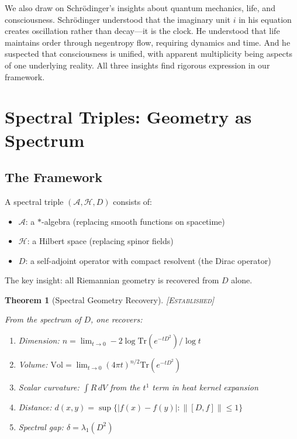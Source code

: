 \documentclass[11pt,a4paper]{article}
\newtheorem{theorem}{Theorem}[section]
\theoremstyle{definition}
\theoremstyle{remark}
\begin{document}
We also draw on Schr\"odinger's insights about quantum mechanics, life, and consciousness. Schr\"odinger understood that the imaginary unit $i$ in his equation creates oscillation rather than decay---it is the clock. He understood that life maintains order through negentropy flow, requiring dynamics and time. And he suspected that consciousness is unified, with apparent multiplicity being aspects of one underlying reality. All three insights find rigorous expression in our framework.

\section{Spectral Triples: Geometry as Spectrum}

\subsection{The Framework}

A spectral triple $(\mathcal{A}, \mathcal{H}, D)$ consists of:
\begin{itemize}
    \item $\mathcal{A}$: a $*$-algebra (replacing smooth functions on spacetime)
    \item $\mathcal{H}$: a Hilbert space (replacing spinor fields)
    \item $D$: a self-adjoint operator with compact resolvent (the Dirac operator)
\end{itemize}

The key insight: all Riemannian geometry is recovered from $D$ alone.

\begin{theorem}[Spectral Geometry Recovery]
\textsc{[Established]}

From the spectrum of $D$, one recovers:
\begin{enumerate}
    \item[(i)] Dimension: $n = \lim_{t \to 0} -2 \log \text{Tr}(e^{-tD^2}) / \log t$
    \item[(ii)] Volume: $\text{Vol} = \lim_{t \to 0} (4\pi t)^{n/2} \text{Tr}(e^{-tD^2})$
    \item[(iii)] Scalar curvature: $\int R \, dV$ from the $t^1$ term in heat kernel expansion
    \item[(iv)] Distance: $d(x,y) = \sup\{ |f(x) - f(y)| : \|[D,f]\| \leq 1 \}$
    \item[(v)] Spectral gap: $\delta = \lambda_1(D^2)$
\end{enumerate}
\end{theorem}
\end{document}

